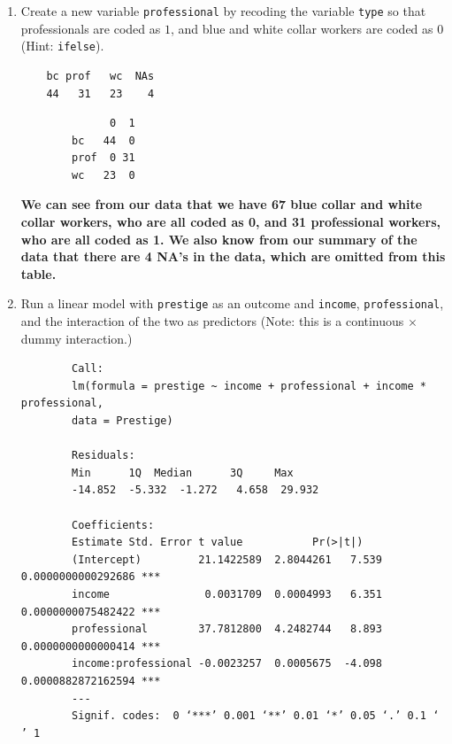 \documentclass[12pt,letterpaper]{article}
\begin{document}
\newpage
\begin{enumerate}
	
		
	
	\item [(a)]
	Create a new variable \texttt{professional} by recoding the variable \texttt{type} so that professionals are coded as $1$, and blue and white collar workers are coded as $0$ (Hint: \texttt{ifelse}).
	
	
	\begin{verbatim}
	bc prof   wc  NAs 
	44   31   23    4 
	\end{verbatim}

	
	
	\begin{verbatim}
		      0  1
		bc   44  0
		prof  0 31
		wc   23  0
	\end{verbatim}
	
	\textbf{We can see from our data that we have 67 blue collar and white collar workers, who are all coded as 0, and 31 professional workers, who are all coded as 1. We also know from our summary of the data that there are 4 NA's in the data, which are omitted from this table.}
	
	\item [(b)]
	Run a linear model with \texttt{prestige} as an outcome and \texttt{income}, \texttt{professional}, and the interaction of the two as predictors (Note: this is a continuous $\times$ dummy interaction.)
	
	
	
	\begin{verbatim}
		Call:
		lm(formula = prestige ~ income + professional + income * professional, 
		data = Prestige)
		
		Residuals:
		Min      1Q  Median      3Q     Max 
		-14.852  -5.332  -1.272   4.658  29.932 
		
		Coefficients:
		Estimate Std. Error t value           Pr(>|t|)    
		(Intercept)         21.1422589  2.8044261   7.539 0.0000000000292686 ***
		income               0.0031709  0.0004993   6.351 0.0000000075482422 ***
		professional        37.7812800  4.2482744   8.893 0.0000000000000414 ***
		income:professional -0.0023257  0.0005675  -4.098 0.0000882872162594 ***
		---
		Signif. codes:  0 ‘***’ 0.001 ‘**’ 0.01 ‘*’ 0.05 ‘.’ 0.1 ‘ ’ 1
		

\end{verbatim}
\end{enumerate}
\end{document}
